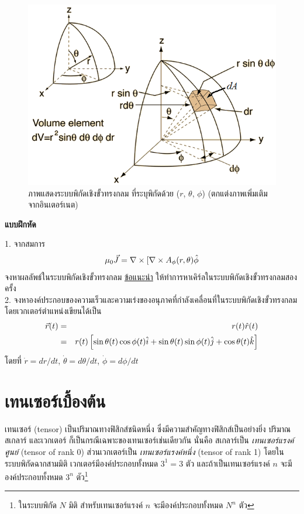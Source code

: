 \begin{figure}[!h]%
\centering
\includegraphics[width=0.75\columnwidth]{sphcoordel.png}
\caption{ภาพแสดงระบบพิกัดเชิงขั้วทรงกลม ที่ระบุพิกัดด้วย ($r$, $\theta$, $\phi$) (ตกแต่งภาพเพิ่มเติมจากอินเตอร์เนต)}
\label{fig7}
\end{figure}

\begin{center}
\Large{\textbf{แบบฝึกหัด}}\\
\end{center}
1. จากสมการ
\begin{equation}\label{SphereCoorProblem1}
\mu_0\vec{J} = \nabla\times[\nabla\times A_\phi(r, \theta)\hat{\phi}
\end{equation}
จงหาผลลัพธ์ในระบบพิกัดเชิงขั้วทรงกลม \underline{ข้อแนะนำ} ให้ทำการหาเคิร์ลในระบบพิกัดเชิงขั้วทรงกลมสองครั้ง\\
2. จงหาองค์ประกอบของความเร็วและความเร่งของอนุภาคที่กำลังเคลื่อนที่ในระบบพิกัดเชิงขั้วทรงกลม โดยเวกเตอร์ตำแหน่งเขียนได้เป็น
\begin{eqnarray}\label{SphereCoorProblem2}
\vec{r}(t) &=& r(t)\hat{r}(t) \nonumber \\
        &=& r(t)\left[\sin\theta(t)\cos\phi(t)\hat{i} + \sin\theta(t)\sin\phi(t)\hat{j} + \cos\theta(t)\hat{k}\right] \nonumber
\end{eqnarray}
โดยที่ $\dot{r} = dr/dt$, $\dot{\theta} = d\theta/dt$, $\dot{\phi} = d\phi/dt$\\

\section{เทนเซอร์เบื้องต้น}

เทนเซอร์ (tensor) เป็นปริมาณทางฟิสิกส์ชนิดหนึ่ง ซึ่งมีความสำคัญทางฟิสิกส์เป็นอย่างยิ่ง ปริมาณสเกลาร์ และเวกเตอร์ ก็เป็นกรณีเฉพาะของเทนเซอร์เช่นเดียวกัน นั่นคือ สเกลาร์เป็น \emph{เทนเซอร์แรงค์ศูนย์} (tensor of rank 0) ส่วนเวกเตอร์เป็น \emph{เทนเซอร์แรงค์หนึ่ง} (tensor of rank 1) โดยในระบบพิกัดฉากสามมิติ เวกเตอร์มีองค์ประกอบทั้งหมด $3^1 = 3$ ตัว และถ้าเป็นเทนเซอร์แรงค์ $n$ จะมีองค์ประกอบทั้งหมด $3^n$ ตัว\footnote{ในระบบพิกัด $N$ มิติ สำหรับเทนเซอร์แรงค์ $n$ จะมีองค์ประกอบทั้งหมด $N^n$ ตัว}

